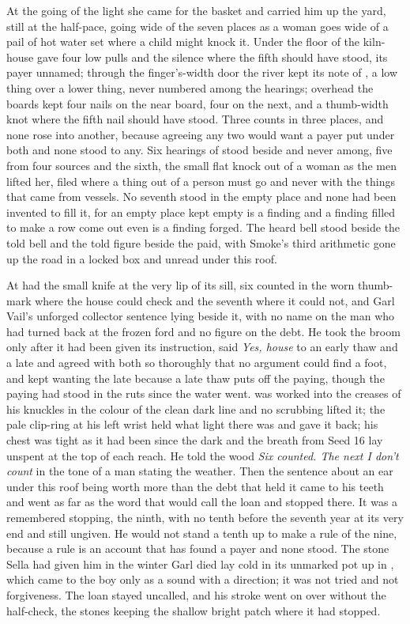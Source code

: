 At the going of the light she came for the basket and carried him up the yard, still at the half-pace, going wide of the seven places as a woman goes wide of a pail of hot water set where a child might knock it. Under the floor of the kiln-house  gave four low pulls and the silence where the fifth should have stood, its payer unnamed; through the finger's-width door the river kept its note of , a low thing over a lower thing, never numbered among the hearings; overhead the boards kept four nails on the near board, four on the next, and a thumb-width knot where the fifth nail should have stood. Three counts in three places, and none rose into another, because agreeing any two would want a payer put under both and none stood to any. Six hearings of  stood beside and never among, five from four sources and the sixth, the small flat knock out of a woman as the men lifted her, filed where a thing out of a person must go and never with the things that came from vessels. No seventh stood in the empty place and none had been invented to fill it, for an empty place kept empty is a finding and a finding filled to make a row come out even is a finding forged. The heard bell stood beside the told bell and the told figure beside the paid, with Smoke's third arithmetic gone up the road in a locked box and unread under this roof.

At   had the small knife at the very lip of its sill, six counted in the worn thumb-mark where the house could check and the seventh where it could not, and Garl Vail's unforged collector sentence lying beside it, with no name on the man who had turned back at the frozen ford and no figure on the debt. He took the broom only after it had been given its instruction, said \emph{Yes, house} to an early thaw and a late and agreed with both so thoroughly that no argument could find a foot, and kept wanting the late because a late thaw puts off the paying, though the paying had stood in the ruts since the water went.  was worked into the creases of his knuckles in the colour of the clean dark line and no scrubbing lifted it; the pale clip-ring at his left wrist held what light there was and gave it back; his chest was tight as it had been since the dark and the breath from Seed 16 lay unspent at the top of each reach. He told the wood \emph{Six counted. The next I don't count} in the tone of a man stating the weather. Then the sentence about an ear under this roof being worth more than the debt that held it came to his teeth and went as far as the word that would call the loan and stopped there. It was a remembered stopping, the ninth, with no tenth before the seventh year at its very end and still ungiven. He would not stand a tenth up to make a rule of the nine, because a rule is an account that has found a payer and none stood. The stone Sella had given him in the winter Garl died lay cold in its unmarked pot up in , which came to the boy only as a sound with a direction; it was not tried and not forgiveness. The loan stayed uncalled, and his stroke went on over  without the half-check, the stones keeping the shallow bright patch where it had stopped.

